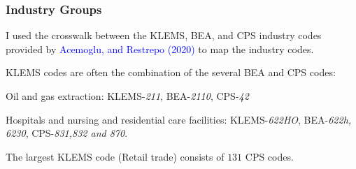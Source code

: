 \documentclass[notes,11pt, aspectratio=169]{beamer}
\newenvironment{wideitemize}{\itemize\addtolength{\itemsep}{10pt}}{\enditemize}
\begin{document}
\begin{frame}
 \frametitle{Industry Groups}
 
 \begin{wideitemize}
 \item I used the crosswalk between the KLEMS, BEA, and CPS industry codes provided by \textcolor{blue}{Acemoglu, and Restrepo (2020)} to map the industry codes.
 \item KLEMS codes are often the combination of the several BEA and CPS codes:
 \pause
 \vspace*{0.5cm}
 \begin{wideitemize}
 \item Oil and gas extraction: KLEMS-\textit{211}, BEA-\textit{2110}, CPS-\textit{42}
 \item Hospitals and nursing and residential care facilities: KLEMS-\textit{622HO}, BEA-\textit{622h, 6230}, CPS-\textit{831,832 and 870}.
 \item The largest KLEMS code (Retail trade) consists of $131$ CPS codes.
 \end{wideitemize}

 
 \end{wideitemize}

 
\end{frame}






\end{document}
